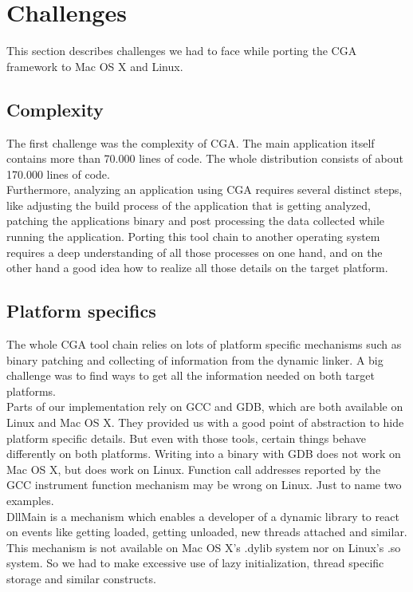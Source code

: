 \section{Challenges} This section describes challenges we had to face while porting the CGA framework to Mac OS X and Linux.

\subsection{Complexity} The first challenge was the complexity of CGA. The main application itself contains more than 70.000 lines of code. The whole distribution consists of about 170.000 lines of code.\\

Furthermore, analyzing an application using CGA requires several distinct steps, like adjusting the build process of the application that is getting analyzed, patching the applications binary and post processing the data collected while running the application. Porting this tool chain to another operating system requires a deep understanding of all those processes on one hand, and on the other hand a good idea how to realize all those details on the target platform.

\subsection{Platform specifics} The whole CGA tool chain relies on lots of platform specific mechanisms such as binary patching and collecting of information from the dynamic linker. A big challenge was to find ways to get all the information needed on both target platforms.\\

Parts of our implementation rely on GCC and GDB, which are both available on Linux and Mac OS X. They provided us with a good point of abstraction to hide platform specific details. But even with those tools, certain things behave differently on both platforms. Writing into a binary with GDB does not work on Mac OS X, but does work on Linux. Function call addresses reported by the GCC instrument function mechanism may be wrong on Linux. Just to name two examples.\\ 

DllMain is a mechanism which enables a developer of a dynamic library to react on events like getting loaded, getting unloaded, new threads attached and similar. This mechanism is not available on Mac OS X's .dylib system nor on Linux's .so system. So we had to make excessive use of lazy initialization, thread specific storage and similar constructs.

